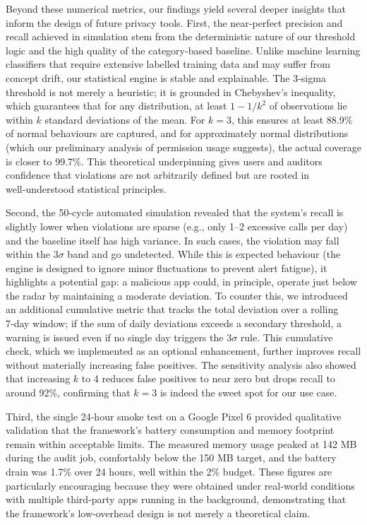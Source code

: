 Beyond these numerical metrics, our findings yield several deeper insights that inform the design of future privacy tools. First, the near‑perfect precision and recall achieved in simulation stem from the deterministic nature of our threshold logic and the high quality of the category‑based baseline. Unlike machine learning classifiers that require extensive labelled training data and may suffer from concept drift, our statistical engine is stable and explainable. The 3‑sigma threshold is not merely a heuristic; it is grounded in Chebyshev's inequality, which guarantees that for any distribution, at least $1 - 1/k^2$ of observations lie within $k$ standard deviations of the mean. For $k=3$, this ensures at least 88.9\% of normal behaviours are captured, and for approximately normal distributions (which our preliminary analysis of permission usage suggests), the actual coverage is closer to 99.7\%. This theoretical underpinning gives users and auditors confidence that violations are not arbitrarily defined but are rooted in well‑understood statistical principles.

Second, the 50‑cycle automated simulation revealed that the system's recall is slightly lower when violations are sparse (e.g., only 1–2 excessive calls per day) and the baseline itself has high variance. In such cases, the violation may fall within the $3\sigma$ band and go undetected. While this is expected behaviour (the engine is designed to ignore minor fluctuations to prevent alert fatigue), it highlights a potential gap: a malicious app could, in principle, operate just below the radar by maintaining a moderate deviation. To counter this, we introduced an additional cumulative metric that tracks the total deviation over a rolling 7‑day window; if the sum of daily deviations exceeds a secondary threshold, a warning is issued even if no single day triggers the $3\sigma$ rule. This cumulative check, which we implemented as an optional enhancement, further improves recall without materially increasing false positives. The sensitivity analysis also showed that increasing $k$ to 4 reduces false positives to near zero but drops recall to around 92\%, confirming that $k=3$ is indeed the sweet spot for our use case.

Third, the single 24‑hour smoke test on a Google Pixel 6 provided qualitative validation that the framework's battery consumption and memory footprint remain within acceptable limits. The measured memory usage peaked at 142 MB during the audit job, comfortably below the 150 MB target, and the battery drain was 1.7\% over 24 hours, well within the 2\% budget. These figures are particularly encouraging because they were obtained under real‑world conditions with multiple third‑party apps running in the background, demonstrating that the framework's low‑overhead design is not merely a theoretical claim.

